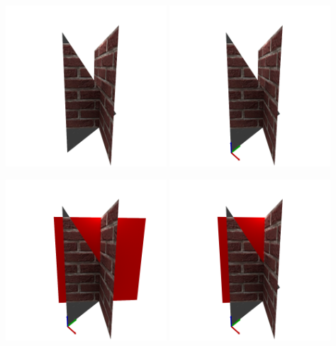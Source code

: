 \documentclass[11pt]{beamer}
\begin{document}
\begin{frame}
    \includegraphics[width=0.45\textwidth]{Reflexion/1}
    \includegraphics[width=0.45\textwidth]{Reflexion/2}
\end{frame}

\begin{frame}
    \includegraphics[width=0.45\textwidth]{Reflexion/3}
    \includegraphics[width=0.45\textwidth]{Reflexion/4}
\end{frame}
\end{document}
